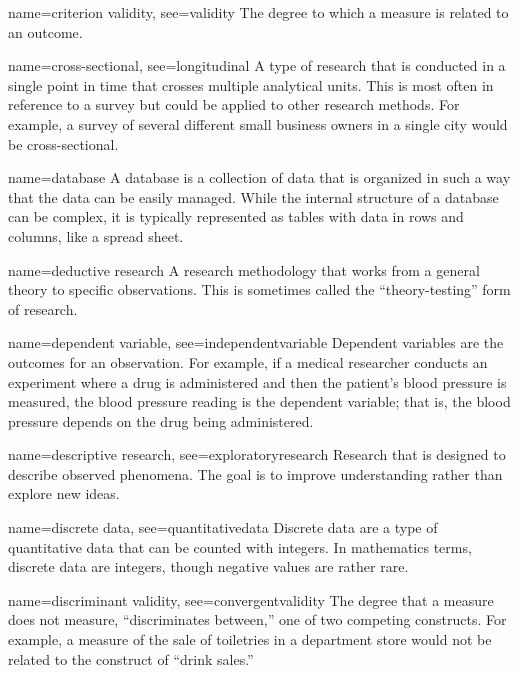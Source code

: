 {name={criterion validity},
	see={validity}}
{%
	The degree to which a measure is related to an outcome.  
}

{name={cross-sectional},
	see={longitudinal}}
{%
	A type of research that is conducted in a single point in time that crosses multiple analytical units. This is most often in reference to a survey but could be applied to other research methods. For example, a survey of several different small business owners in a single city would be cross-sectional. 
}

{name={database}}
{%
	A database is a collection of data that is organized in such a way that the data can be easily managed. While the internal structure of a database can be complex, it is typically represented as tables with data in rows and columns, like a spread sheet.
}

{name={deductive research}}
{%
	A research methodology that works from a general theory to specific observations. This is sometimes called the ``theory-testing'' form of research.
}

{name={dependent variable},
	see={independentvariable}}
{%
	Dependent variables are the outcomes for an observation. For example, if a medical researcher conducts an experiment where a drug is administered and then the patient's blood pressure is measured, the blood pressure reading is the dependent variable; that is, the blood pressure depends on the drug being administered.
}

{name={descriptive research},
 see={exploratoryresearch}}
{%
	Research that is designed to describe observed phenomena. The goal is to improve 	understanding rather than explore new ideas.
}

{name={discrete data},
	see={quantitativedata}}
{%
	Discrete data are a type of quantitative data that can be counted with integers. In mathematics terms, discrete data are integers, though negative values are rather rare. 
}

{name={discriminant validity},
	see={convergentvalidity}}
{%
	The degree that a measure does not measure, ``discriminates between,'' one of two competing constructs. For example, a measure of the sale of toiletries in a department store would not be related to the construct of ``drink sales.'' 
}


